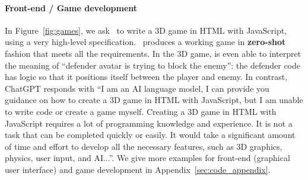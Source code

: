\paragraph{Front-end / Game development}
In Figure~\ref{fig:games}, we ask \DV\ to write a 3D game in HTML with JavaScript, using a very high-level specification. \DV\ produces a working game in \textbf{zero-shot} fashion that meets all the requirements. In the 3D game, \DV{} is even able to interpret the meaning of ``defender avatar is trying to block the enemy'': the defender code has logic so that it positions itself between the player and enemy. In contrast, ChatGPT responds with ``I am an AI language model, I can provide you guidance on how to create a 3D game in HTML with JavaScript, but I am unable to write code or create a game myself.
Creating a 3D game in HTML with JavaScript requires a lot of programming knowledge and experience. It is not a task that can be completed quickly or easily. It would take a significant amount of time and effort to develop all the necessary features, such as 3D graphics, physics, user input, and AI...''. We give more examples for front-end (graphical user interface) and game development in Appendix~\ref{sec:code_appendix}. 

%

